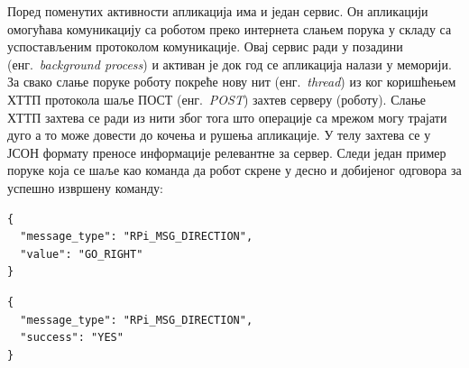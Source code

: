 \documentclass[12pt,oneside]{memoir}
\theoremstyle{remark}
\begin{document}
Поред поменутих активности апликација има и један сервис. Он апликацији омогућава комуникацију са роботом преко интернета слањем порука у складу са успостављеним протоколом комуникације. Овај сервис ради у позадини (енг.~{\em background process}) и активан је док год се апликација налази у меморији. За свако слање поруке роботу покреће нову нит (енг.~{\em thread}) из ког коришћењем ХТТП протокола шаље ПОСТ (енг.~{\em POST}) захтев серверу (роботу). Слање ХТТП захтева се ради из нити због тога што операције са мрежом могу трајати дуго а то може довести до кочења и рушења апликације. У телу захтева се у ЈСОН формату преносе информације релевантне за сервер. Следи један пример поруке која се шаље као команда да робот скрене у десно и добијеног одговора за успешно извршену команду:


\begin{lstlisting}[caption={Пример захтева који се шаље роботу за скретање у десно},captionpos=b]
{
  "message_type": "RPi_MSG_DIRECTION",
  "value": "GO_RIGHT"
}
\end{lstlisting}

\begin{lstlisting}[caption={Пример одговора који се добија од робота за успешно извршену команду},captionpos=b]
{
  "message_type": "RPi_MSG_DIRECTION",
  "success": "YES"
}
\end{lstlisting}
\end{document}
